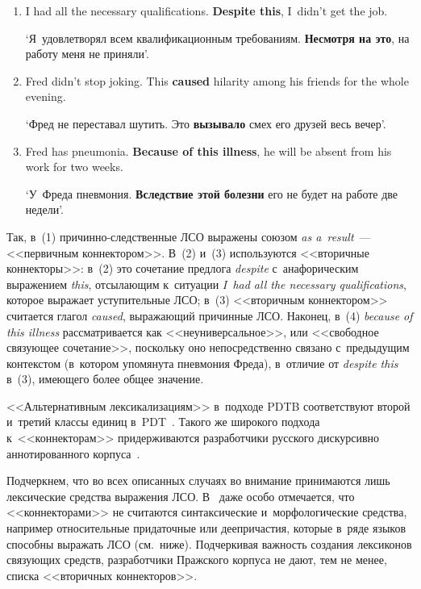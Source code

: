 \begin{multicols}{2}
{\begin{enumerate}[(1)]
`Фред не переставал шутить. \textbf{В~результате} его друзья смеялись весь 
вечер'.\footnote[2]{Здесь и~далее в~отсутствие других указаний перевод авторов статьи.}

\item  I had all the necessary qualifications. \textbf{Despite this}, I~didn't get the job.

`Я~удовлетворял всем квалификационным требованиям. \textbf{Несмотря на это}, на 
работу меня не приняли'.

\item 
Fred didn't stop joking. This \textbf{caused} hilarity among his friends for the whole evening.

`Фред не переставал шутить. Это \textbf{вызывало} смех его друзей весь вечер'.

\item 
 Fred has pneumonia. \textbf{Because of this illness}, he will be absent from his work for 
two weeks.

`У~Фреда пневмония. \textbf{Вследствие этой болезни} его не будет на работе две 
недели'.
\end{enumerate}
}

Так, в~(1) причинно-следственные ЛСО выражены союзом \textit{as 
a~result}~--- <<первичным коннектором>>. В~(2) и~(3) используются 
<<вторичные коннекторы>>: в~(2) это сочетание предлога \textit{despite} 
с~анафорическим выражением \textit{this}, отсылающим к~ситуации 
\textit{I~had all the necessary qualifications}, которое выражает уступительные 
ЛСО; в~(3) <<вторичным коннектором>> считается глагол \textit{caused}, 
вы\-ра\-жа\-ющий причинные ЛСО. Наконец, в~(4) \textit{because of this illness} 
рассматривается как <<неуниверсальное>>, или <<свободное связующее 
сочетание>>, поскольку оно непосредственно связано с~предыдущим 
контекстом (в~котором упомянута пневмония Фреда), в~отличие от 
\textit{despite this} в~(3), имеющего более общее значение. 

<<Альтернативным лексикализациям>> в~подходе PDTB соответствуют 
второй и~третий классы единиц в~PDT~\cite[с.~54]{3-in}. Такого же широкого 
подхода к~<<коннекторам>> придерживаются \mbox{разработчики} русского 
дискурсивно аннотированного корпуса~\cite{13-in}.

Подчеркнем, что во всех описанных случаях во внимание принимаются лишь 
лексические средства выражения ЛСО. В~\cite[с.~62]{3-in} даже особо 
отмечается, что <<коннекторами>> не считаются синтаксические 
и~морфологические средства, например относительные придаточные или 
деепричастия, которые в~ряде языков способны выражать ЛСО (см.\ ниже). 
Подчеркивая важность создания лексиконов связующих средств, 
разработчики Пражского корпуса не дают, тем не менее, списка 
<<вторичных коннекторов>>.


\end{multicols}
